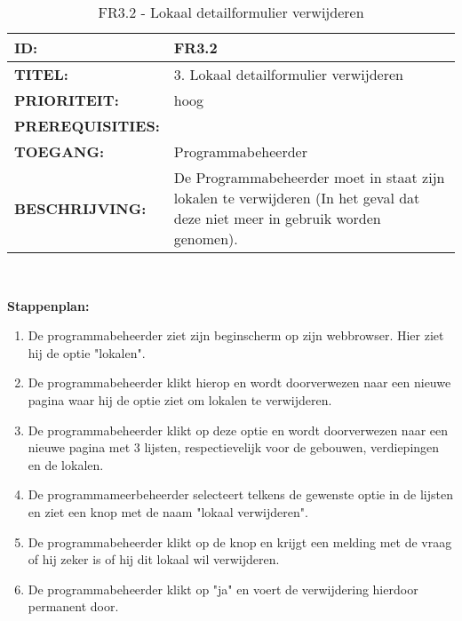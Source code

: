 \noindent\begin{table}[H]
            \begin{tabular}{l | p{10cm}}
                \textbf{ID:} & FR3.2 \\ \hline
                \textbf{TITEL:} & 3. Lokaal detailformulier verwijderen\\ \hline
                \textbf{PRIORITEIT:} &  hoog \\ \hline
                \textbf{PREREQUISITIES:} & \\ \hline
                \textbf{TOEGANG:} & Programmabeheerder \\ \hline
                \textbf{BESCHRIJVING:} & De Programmabeheerder moet in staat zijn lokalen te verwijderen (In het geval dat deze niet meer in gebruik worden genomen).\\ 
            \end{tabular}\\
            \caption{FR3.2 - Lokaal detailformulier verwijderen}
            \label{tab:FR3.2- Lokaal detailformulier verwijderen}
        \end{table}
        
\textbf{Stappenplan:}       
\begin{enumerate}
\item De programmabeheerder ziet zijn beginscherm op zijn webbrowser. Hier ziet hij de optie "lokalen".
\item De programmabeheerder klikt hierop en wordt doorverwezen naar een nieuwe pagina waar hij de optie ziet om lokalen te verwijderen.
\item De programmabeheerder klikt op deze optie en wordt doorverwezen naar een nieuwe pagina met 3 lijsten, respectievelijk voor de gebouwen, verdiepingen en de lokalen.
\item De programmameerbeheerder selecteert telkens de gewenste optie in de lijsten en ziet een knop met de naam "lokaal verwijderen".
\item De programmabeheerder klikt op de knop en krijgt een melding met de vraag of hij zeker is of hij dit lokaal wil verwijderen.
\item De programmabeheerder klikt op "ja" en voert de verwijdering hierdoor permanent door.
\end{enumerate}      

